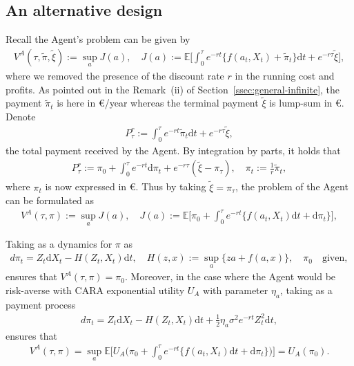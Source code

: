 \documentclass[a4paper,10pt]{article}
\newcommand{\E}{\mathbb{E}}
\newcommand{\dd}{\mathrm{d}}
\theoremstyle{definition}
\theoremstyle{plain}
\numberwithin{equation}{section}
\begin{document}
\subsection{An alternative design}\label{ssec:alternative}


Recall the Agent's problem can be given by
\begin{align*}
V^A(\tau, \tilde \pi, \tilde \xi) := \sup_{a} J(a), \quad J(a) := \E\Big[\int_0^\tau e^{-r t} \big\{f(a_t,X_t)  + \tilde \pi_t\big\} \dd t + e^{-r \tau} \tilde \xi\Big],
\end{align*}
where we  removed the presence of the discount rate $r$ in the running cost and profits. As pointed out in the Remark~(ii) of Section~\ref{ssec:general-infinite}, the payment $\tilde \pi_t$ is here in \euro/year whereas the terminal payment $\tilde \xi$ is lump-sum in \euro.  Denote 
\begin{align*}
P^r_\tau := \int_0^\tau e^{- r t} \tilde\pi_t \dd t + e^{-r \tau} \tilde\xi,
\end{align*}
the total payment received by the Agent. By integration by parts, it holds that
\begin{align*}
P^r_\tau :=  \pi_0 + \int_0^\tau e^{- r t} \dd \pi_t  + e^{-r \tau} (\tilde\xi - \pi_\tau), \quad \pi_t := \frac1r \tilde\pi_t,
\end{align*}
where $\pi_t$ is now expressed in \euro. Thus by taking $\tilde \xi = \pi_\tau$, the problem of the Agent can be formulated as
\begin{align*}
V^A(\tau, \pi) := \sup_{a} J(a), \quad J(a) := \E\Big[ \pi_0 + \int_0^\tau e^{-r t} \big\{f(a_t,X_t) \dd t + \dd\pi_t\big\}\Big],
\end{align*}

Taking as a dynamics for $\pi$ as
\begin{align}\label{eq:pi-ra}
d\pi_t =   Z_t \dd X_t - H(Z_t,X_t) \dd t, \quad H(z,x) := \sup_{a} \big\{ z a + f(a,x)\big\}, \quad \pi_0 \quad \text{given},
\end{align}
ensures that $V^A(\tau, \pi) =  \pi_0.$  Moreover, in the case where the Agent would be risk-averse with CARA exponential utility $U_A$ with parameter $\eta_a$, taking as a payment process
\begin{align}
d\pi_t =   Z_t \dd X_t - H(Z_t,X_t) \dd t + \frac12 \eta_a \sigma^2 e^{- r t} Z_t^2 \dd t,
\end{align}
ensures that 
\begin{align*}
V^A(\tau, \pi) =  \sup_{a} \E\Big[ U_A\Big(\pi_0 + \int_0^\tau e^{-r t} \big\{f(a_t,X_t) \dd t + \dd\pi_t\big\} \Big)\Big] = U_A(\pi_0).
\end{align*}
\end{document}
